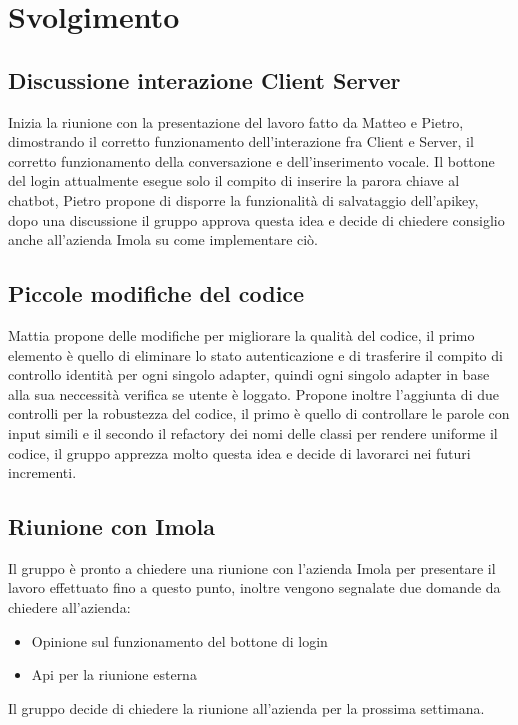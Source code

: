 \section{Svolgimento}
\subsection{Discussione interazione Client Server}
	Inizia la riunione con la presentazione del lavoro fatto da Matteo e Pietro, dimostrando il corretto funzionamento dell'interazione fra Client e Server, il corretto funzionamento della conversazione e dell'inserimento vocale.
	Il bottone del login attualmente esegue solo il compito di inserire la parora chiave al chatbot, Pietro propone di disporre la funzionalità di salvataggio dell'apikey, dopo una discussione il gruppo approva questa idea e decide di chiedere consiglio anche all'azienda Imola su come implementare ciò.
	
	\subsection{Piccole modifiche del codice}
	Mattia propone delle modifiche per migliorare la qualità del codice, il primo elemento è quello di eliminare lo stato autenticazione e di trasferire il compito di controllo identità per ogni singolo adapter, quindi ogni singolo adapter in base alla sua neccessità verifica se utente è loggato.
	Propone inoltre l'aggiunta di due controlli per la robustezza del codice, il primo è quello di controllare le parole con input simili e il secondo il refactory dei nomi delle classi per rendere uniforme il codice, il gruppo apprezza molto questa idea e decide di lavorarci nei futuri incrementi.
	
	\subsection{Riunione con Imola}
	Il gruppo è pronto a chiedere una riunione con l'azienda Imola per presentare il lavoro effettuato fino a questo punto, inoltre vengono segnalate due domande da chiedere all'azienda:
	\begin{itemize}
	\item Opinione sul funzionamento del bottone di login
	\item Api per la riunione esterna
	\end{itemize}
	Il gruppo decide di chiedere la riunione all'azienda per la prossima settimana.


